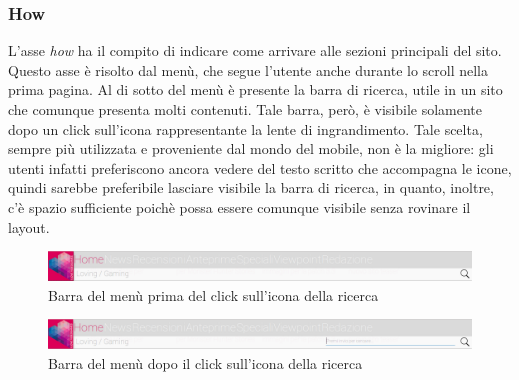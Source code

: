 \documentclass[../ProgettoTecWeb2.tex]{subfiles}
\begin{document}
		\subsubsection{How}
			L'asse \textit{how} ha il compito di indicare come arrivare alle sezioni principali del sito. Questo asse è risolto dal menù, che segue l'utente anche durante lo scroll nella prima pagina. Al di sotto del menù è presente la barra di ricerca, utile in un sito che comunque presenta molti contenuti. Tale barra, però, è visibile solamente dopo un click sull'icona rappresentante la lente di ingrandimento. Tale scelta, sempre più utilizzata e proveniente dal mondo del mobile, non è la migliore: gli utenti infatti preferiscono ancora vedere del testo scritto che accompagna le icone, quindi sarebbe preferibile lasciare visibile la barra di ricerca, in quanto, inoltre, c'è spazio sufficiente poichè possa essere comunque visibile senza rovinare il layout.
			\begin{figure} [h]
				\centering
				\includegraphics[scale=0.3]{img/BarraMenuILoveVg}
				\caption{Barra del menù prima del click sull'icona della ricerca}
				\label{fig:AprireProgetto}
			\end{figure}
			\begin{figure} [h]
				\centering
				\includegraphics[scale=0.3]{img/BarraMenuILoveVgDopoClick}
				\caption{Barra del menù dopo il click sull'icona della ricerca}
				\label{fig:AprireProgetto}
			\end{figure}
\end{document}
